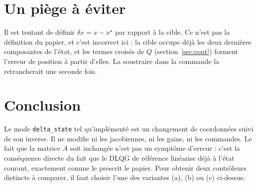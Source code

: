 \documentclass[11pt,a4paper]{article}
\begin{document}
\section{Un piège à éviter}
Il est tentant de définir $\delta x=x-x^\star$ par rapport à la cible. Ce n'est pas la
définition du papier, et c'est incorrect ici : la cible occupe déjà les deux dernières
composantes de l'état, et les termes croisés de $Q$ (section~\ref{sec:cout}) forment l'erreur de
position à partir d'elles. La soustraire dans la commande la retrancherait une seconde fois.

\section{Conclusion}
Le mode \texttt{delta\_state} tel qu'implémenté est un changement de coordonnées suivi de son
inverse. Il ne modifie ni les jacobiennes, ni les gains, ni les commandes. Le fait que la
matrice $A$ soit inchangée n'est pas un symptôme d'erreur : c'est la conséquence directe du fait
que le DLQG de référence linéarise déjà à l'état courant, exactement comme le prescrit le
papier. Pour obtenir deux contrôleurs distincts à comparer, il faut choisir l'une des variantes
(a), (b) ou (c) ci-dessus.
\end{document}
